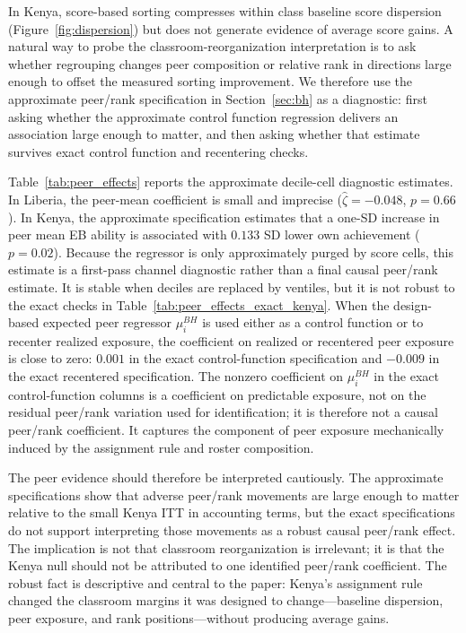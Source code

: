 \documentclass[11pt]{article}
\begin{document}
In Kenya, score-based sorting compresses within class baseline score dispersion (Figure~\ref{fig:dispersion}) but does not generate evidence of average score gains. A natural way to probe the classroom-reorganization interpretation is to ask whether regrouping changes peer composition or relative rank in directions large enough to offset the measured sorting improvement. We therefore use the approximate peer/rank specification in Section~\ref{sec:bh} as a diagnostic: first asking whether the approximate control function regression delivers an association large enough to matter, and then asking whether that estimate survives exact control function and recentering checks.

Table~\ref{tab:peer_effects} reports the approximate decile-cell diagnostic estimates. In Liberia, the peer-mean coefficient is small and imprecise ($\hat{\zeta} = -0.048$, $p = 0.66$). In Kenya, the approximate specification estimates that a one-SD increase in peer mean EB ability is associated with $0.133$ SD lower own achievement ($p = 0.02$). Because the regressor is only approximately purged by score cells, this estimate is a first-pass channel diagnostic rather than a final causal peer/rank estimate. It is stable when deciles are replaced by ventiles, but it is not robust to the exact checks in Table~\ref{tab:peer_effects_exact_kenya}. When the design-based expected peer regressor $\mu_i^{BH}$ is used either as a control function or to recenter realized exposure, the coefficient on realized or recentered peer exposure is close to zero: $0.001$ in the exact control-function specification and $-0.009$ in the exact recentered specification. The nonzero coefficient on $\mu_i^{BH}$ in the exact control-function columns is a coefficient on predictable exposure, not on the residual peer/rank variation used for identification; it is therefore not a causal peer/rank coefficient. It captures the component of peer exposure mechanically induced by the assignment rule and roster composition.

The peer evidence should therefore be interpreted cautiously. The approximate specifications show that adverse peer/rank movements are large enough to matter relative to the small Kenya ITT in accounting terms, but the exact specifications do not support interpreting those movements as a robust causal peer/rank effect. The implication is not that classroom reorganization is irrelevant; it is that the Kenya null should not be attributed to one identified peer/rank coefficient. The robust fact is descriptive and central to the paper: Kenya's assignment rule changed the classroom margins it was designed to change---baseline dispersion, peer exposure, and rank positions---without producing average gains.
\end{document}
